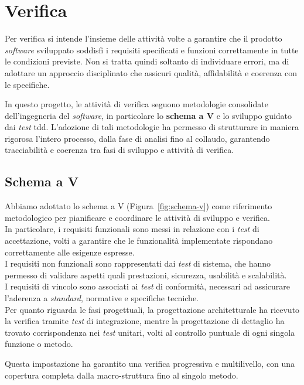 \section{Verifica}
Per verifica si intende l'insieme delle attività volte a garantire che il prodotto \textit{software} sviluppato soddisfi i requisiti specificati e funzioni correttamente in tutte le condizioni previste. Non si tratta quindi soltanto di individuare errori, ma di adottare un approccio disciplinato che assicuri qualità, affidabilità e coerenza con le specifiche.  

In questo progetto, le attività di verifica seguono metodologie consolidate dell'ingegneria del \textit{software}, in particolare lo \textbf{schema a V} e lo sviluppo guidato dai \textit{test} \gls{tdd}. L'adozione di tali metodologie ha permesso di strutturare in maniera rigorosa l'intero processo, dalla fase di analisi fino al collaudo, garantendo tracciabilità e coerenza tra fasi di sviluppo e attività di verifica.  

\subsection*{Schema a V}
Abbiamo adottato lo schema a V (Figura~\ref{fig:schema-v}) come riferimento metodologico per pianificare e coordinare le attività di sviluppo e verifica.\\
In particolare, i requisiti funzionali sono messi in relazione con i \textit{test} di accettazione, volti a garantire che le funzionalità implementate rispondano correttamente alle esigenze espresse.\\
I requisiti non funzionali sono rappresentati dai \textit{test} di sistema, che hanno permesso di validare aspetti quali prestazioni, sicurezza, usabilità e scalabilità.\\
I requisiti di vincolo sono associati ai \textit{test} di conformità, necessari ad assicurare l'aderenza a \textit{standard}, normative e specifiche tecniche.\\
Per quanto riguarda le fasi progettuali, la progettazione architetturale ha ricevuto la verifica tramite \textit{test} di integrazione, mentre la progettazione di dettaglio ha trovato corrispondenza nei \textit{test} unitari, volti al controllo puntuale di ogni singola funzione o metodo.


Questa impostazione ha garantito una verifica progressiva e multilivello, con una copertura completa dalla macro-struttura fino al singolo metodo.  

